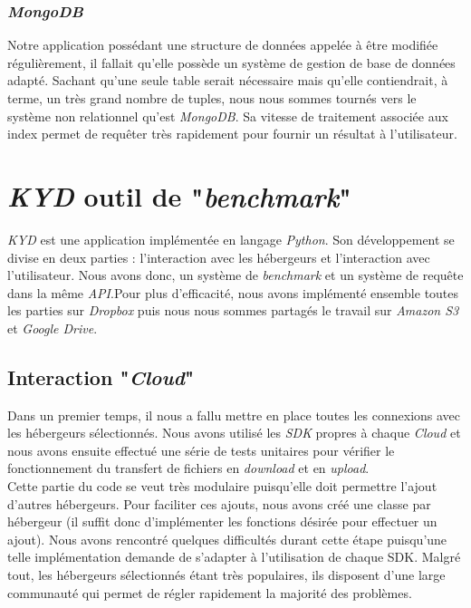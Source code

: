 \documentclass[10pt]{article}
\begin{document}
\subsubsection{\textit{MongoDB}}

Notre application possédant une structure de données appelée à être modifiée
régulièrement, il fallait qu'elle possède un système de gestion de base de
données adapté. Sachant qu'une seule table serait nécessaire mais qu'elle
contiendrait, à terme, un très grand nombre de tuples, nous nous sommes tournés
vers le système non relationnel qu'est \textit{MongoDB}. Sa vitesse de
traitement associée aux index permet de requêter très rapidement pour fournir
un résultat à l'utilisateur.

\section{\textit{KYD} outil de "\textit{benchmark}" }

\textit{KYD} est une application implémentée en langage \textit{Python}. Son
développement se divise en deux parties : l'interaction avec les hébergeurs et
l'interaction avec l'utilisateur. Nous avons donc, un système de
\textit{benchmark} et un système de requête dans la même \textit{API}.Pour plus
d'efficacité, nous avons implémenté ensemble toutes les parties sur
\textit{Dropbox} puis nous nous sommes partagés le travail sur \textit{Amazon
S3} et \textit{Google Drive}.

\subsection{Interaction "\textit{Cloud}"}

Dans un premier temps, il nous a fallu mettre en place toutes les connexions
avec les hébergeurs sélectionnés. Nous avons utilisé les \textit{SDK} propres à
chaque \textit{Cloud} et nous avons ensuite effectué une série de tests
unitaires pour vérifier le fonctionnement du transfert de fichiers en
\textit{download} et en \textit{upload}.\\

Cette partie du code se veut très modulaire puisqu'elle doit permettre l'ajout
d'autres hébergeurs. Pour faciliter ces ajouts, nous avons créé une classe par
hébergeur (il suffit donc d'implémenter les fonctions désirée pour effectuer un
ajout). Nous avons rencontré quelques difficultés durant cette étape puisqu'une
telle implémentation demande de s'adapter à l'utilisation de chaque SDK. Malgré
tout, les hébergeurs sélectionnés étant très populaires, ils disposent d'une
large communauté qui permet de régler rapidement la majorité des problèmes.
\end{document}
